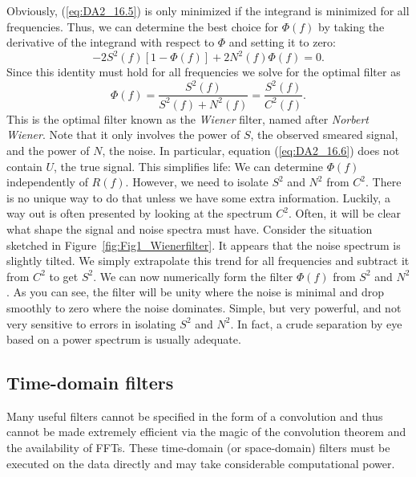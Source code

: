 Obviously, (\ref{eq:DA2_16.5}) is only minimized if the integrand is minimized for all frequencies. Thus, we
can determine the best choice for $\Phi (f)$ by taking the derivative of the integrand with
respect to $\Phi$ and setting it to zero:
$$
-2S ^2 (f) \left [ 1 - \Phi (f) \right ] + 2 N^2 (f) \Phi (f) = 0.
$$
Since this identity must hold for all frequencies we solve for the optimal filter as
\begin{equation}
\Phi (f) = \frac{S^2 (f)} {S^2 (f) + N^2 (f)} = \frac{S^2(f) } {C^2(f)}.
\label{eq:DA2_16.6}
\end{equation}
This is the optimal filter known as the \emph{Wiener} filter, named after \emph{Norbert Wiener}. Note that it only involves the power of
$S$, the observed smeared signal, and the power of $N$, the noise. In particular, equation (\ref{eq:DA2_16.6}) does not contain $U$, the true
signal. This simplifies life: We can determine $\Phi(f)$ independently of $R(f)$. However, we
need to isolate $S^2$ and $N^2$ from $C^2$. There is no unique way to do that unless we have some
extra information. Luckily, a way out is often presented by looking at the spectrum $C^2$.
Often, it will be clear what shape the signal and noise spectra must have. Consider the
situation sketched in Figure~\ref{fig:Fig1_Wienerfilter}.
It appears that the noise spectrum is slightly tilted. We simply extrapolate this trend for all
frequencies and subtract it from $C^2$ to get $S^2$. We can now numerically form the filter $\Phi(f)$ from $S^2$ and $N^2$. As
you can see, the filter will be unity where the noise is minimal and drop smoothly to zero
where the noise dominates. Simple, but very powerful, and not very sensitive to errors in
isolating $S^2$ and $N^2$. In fact, a crude separation by eye based on a power spectrum is
usually adequate.


\subsection{Time-domain filters}
Many useful filters cannot be specified in the form of a convolution and thus cannot be made
extremely efficient via the magic of the convolution theorem and the availability of FFTs.  These time-domain (or space-domain)
filters must be executed on the data directly and may take considerable computational power.
